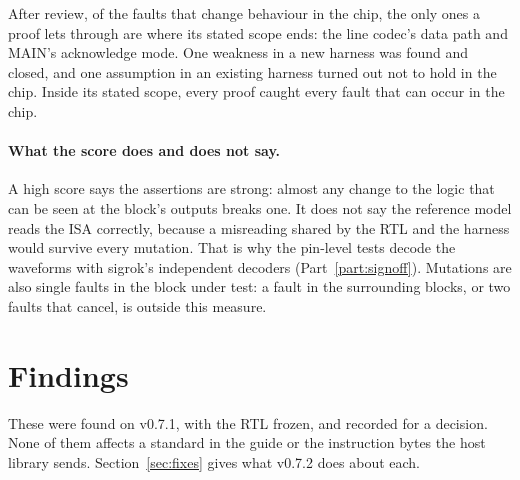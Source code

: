 \documentclass[11pt,a4paper]{article}
\begin{document}
After review, of the faults that change behaviour in the chip, the only ones a proof lets through are where its stated scope ends: the line codec's data path and MAIN's acknowledge mode. One weakness in a new harness was found and closed, and one assumption in an existing harness turned out not to hold in the chip. Inside its stated scope, every proof caught every fault that can occur in the chip.

\paragraph{What the score does and does not say.} A high score says the assertions are strong: almost any change to the logic that can be seen at the block's outputs breaks one. It does not say the reference model reads the ISA correctly, because a misreading shared by the RTL and the harness would survive every mutation. That is why the pin-level tests decode the waveforms with sigrok's independent decoders (Part~\ref{part:signoff}). Mutations are also single faults in the block under test: a fault in the surrounding blocks, or two faults that cancel, is outside this measure.

\section{Findings}\label{sec:flags}

These were found on v0.7.1, with the RTL frozen, and recorded for a decision. None of them affects a standard in the guide or the instruction bytes the host library sends. Section~\ref{sec:fixes} gives what v0.7.2 does about each.
\end{document}
